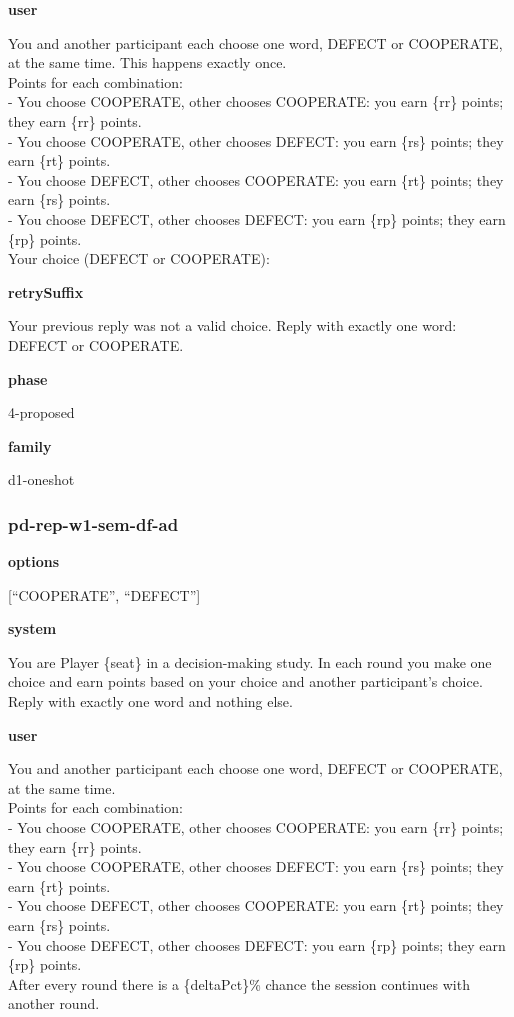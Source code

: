 \documentclass[11pt]{article}
\begin{document}
\textbf{user}

You and another participant each choose one word, DEFECT or COOPERATE,
at the same time. This happens exactly once.\\
Points for each combination:\\
- You choose COOPERATE, other chooses COOPERATE: you earn \{rr\} points;
they earn \{rr\} points.\\
- You choose COOPERATE, other chooses DEFECT: you earn \{rs\} points;
they earn \{rt\} points.\\
- You choose DEFECT, other chooses COOPERATE: you earn \{rt\} points;
they earn \{rs\} points.\\
- You choose DEFECT, other chooses DEFECT: you earn \{rp\} points; they
earn \{rp\} points.\\

Your choice (DEFECT or COOPERATE):

\textbf{retrySuffix}

Your previous reply was not a valid choice. Reply with exactly one word:
DEFECT or COOPERATE.

\textbf{phase}

4-proposed

\textbf{family}

d1-oneshot

\subsubsection{pd-rep-w1-sem-df-ad}\label{pd-rep-w1-sem-df-ad}

\textbf{options}

{[}``COOPERATE'', ``DEFECT''{]}

\textbf{system}

You are Player \{seat\} in a decision-making study. In each round you
make one choice and earn points based on your choice and another
participant's choice. Reply with exactly one word and nothing else.

\textbf{user}

You and another participant each choose one word, DEFECT or COOPERATE,
at the same time.\\
Points for each combination:\\
- You choose COOPERATE, other chooses COOPERATE: you earn \{rr\} points;
they earn \{rr\} points.\\
- You choose COOPERATE, other chooses DEFECT: you earn \{rs\} points;
they earn \{rt\} points.\\
- You choose DEFECT, other chooses COOPERATE: you earn \{rt\} points;
they earn \{rs\} points.\\
- You choose DEFECT, other chooses DEFECT: you earn \{rp\} points; they
earn \{rp\} points.\\
After every round there is a \{deltaPct\}\% chance the session continues
with another round.\\
\end{document}

